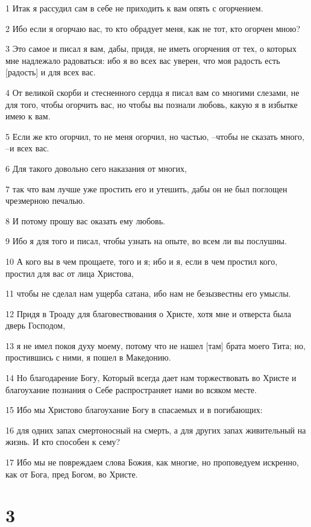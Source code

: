 \par 1 Итак я рассудил сам в себе не приходить к вам опять с огорчением.
\par 2 Ибо если я огорчаю вас, то кто обрадует меня, как не тот, кто огорчен мною?
\par 3 Это самое и писал я вам, дабы, придя, не иметь огорчения от тех, о которых мне надлежало радоваться: ибо я во всех вас уверен, что моя радость есть [радость] и для всех вас.
\par 4 От великой скорби и стесненного сердца я писал вам со многими слезами, не для того, чтобы огорчить вас, но чтобы вы познали любовь, какую я в избытке имею к вам.
\par 5 Если же кто огорчил, то не меня огорчил, но частью, --чтобы не сказать много, --и всех вас.
\par 6 Для такого довольно сего наказания от многих,
\par 7 так что вам лучше уже простить его и утешить, дабы он не был поглощен чрезмерною печалью.
\par 8 И потому прошу вас оказать ему любовь.
\par 9 Ибо я для того и писал, чтобы узнать на опыте, во всем ли вы послушны.
\par 10 А кого вы в чем прощаете, того и я; ибо и я, если в чем простил кого, простил для вас от лица Христова,
\par 11 чтобы не сделал нам ущерба сатана, ибо нам не безызвестны его умыслы.
\par 12 Придя в Троаду для благовествования о Христе, хотя мне и отверста была дверь Господом,
\par 13 я не имел покоя духу моему, потому что не нашел [там] брата моего Тита; но, простившись с ними, я пошел в Македонию.
\par 14 Но благодарение Богу, Который всегда дает нам торжествовать во Христе и благоухание познания о Себе распространяет нами во всяком месте.
\par 15 Ибо мы Христово благоухание Богу в спасаемых и в погибающих:
\par 16 для одних запах смертоносный на смерть, а для других запах живительный на жизнь. И кто способен к сему?
\par 17 Ибо мы не повреждаем слова Божия, как многие, но проповедуем искренно, как от Бога, пред Богом, во Христе.

\chapter{3}

